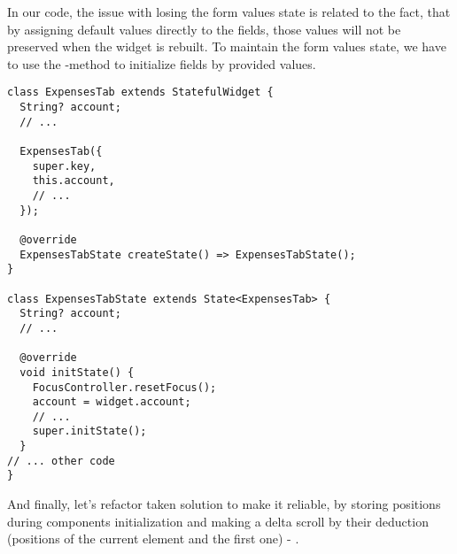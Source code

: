 In our code, the issue with losing the form values state is related to the fact, that by assigning default values 
directly to the fields, those values will not be preserved when the widget is rebuilt. To maintain the form values 
state, we have to use the -method to initialize fields by provided values.

\begin{lstlisting}
class ExpensesTab extends StatefulWidget {
  String? account;
  // ...

  ExpensesTab({
    super.key,
    this.account,
    // ...
  });

  @override
  ExpensesTabState createState() => ExpensesTabState();
}

class ExpensesTabState extends State<ExpensesTab> {
  String? account;
  // ...

  @override
  void initState() {
    FocusController.resetFocus();
    account = widget.account;
    // ...
    super.initState();
  }
// ... other code
}
\end{lstlisting}

And finally, let's refactor taken solution to make it reliable, by storing positions during components initialization
and making a delta scroll by their deduction (positions of the current element and the first one) - .
